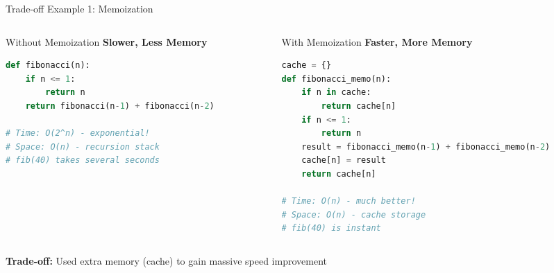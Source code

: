 \documentclass[aspectratio=169,xcolor=dvipsnames]{beamer}
\begin{document}
\begin{frame}[fragile]{Trade-off Example 1: Memoization}
  \begin{columns}
    \begin{column}{0.48\textwidth}
      \begin{block}{Without Memoization}
        \textbf{Slower, Less Memory}
        \begin{lstlisting}[language=Python,basicstyle=\tiny\ttfamily]
def fibonacci(n):
    if n <= 1:
        return n
    return fibonacci(n-1) + fibonacci(n-2)

# Time: O(2^n) - exponential!
# Space: O(n) - recursion stack
# fib(40) takes several seconds
        \end{lstlisting}
      \end{block}
    \end{column}
    \begin{column}{0.48\textwidth}
      \begin{block}{With Memoization}
        \textbf{Faster, More Memory}
        \begin{lstlisting}[language=Python,basicstyle=\tiny\ttfamily]
cache = {}
def fibonacci_memo(n):
    if n in cache:
        return cache[n]
    if n <= 1:
        return n
    result = fibonacci_memo(n-1) + fibonacci_memo(n-2)
    cache[n] = result
    return cache[n]

# Time: O(n) - much better!
# Space: O(n) - cache storage
# fib(40) is instant
        \end{lstlisting}
      \end{block}
    \end{column}
  \end{columns}

  \vspace{0.3cm}

  \begin{center}
    \textbf{Trade-off:} Used extra memory (cache) to gain massive speed improvement
  \end{center}
\end{frame}
\end{document}
